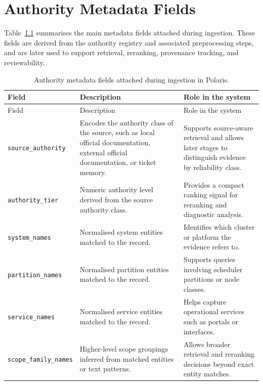 \chapter{Authority Metadata Fields}
\label{app:authority-metadata-fields}

Table~\ref{tab:authority-metadata-fields} summarises the main metadata fields attached during ingestion. These fields are derived from the authority registry and associated preprocessing steps, and are later used to support retrieval, reranking, provenance tracking, and reviewability.

\begin{longtable}{@{}p{} p{} p{}@{}}
\caption[Authority metadata fields attached during ingestion.]{Authority metadata fields attached during ingestion in Polaris.}
\label{tab:authority-metadata-fields} \\
\toprule
Field & Description & Role in the system \\
\midrule
\endfirsthead

\toprule
Field & Description & Role in the system \\
\midrule
\endhead

\bottomrule
\endfoot

\texttt{source\_authority} & Encodes the authority class of the source, such as local official documentation, external official documentation, or ticket memory. & Supports source-aware retrieval and allows later stages to distinguish evidence by reliability class. \\

\texttt{authority\_tier} & Numeric authority level derived from the source authority class. & Provides a compact ranking signal for reranking and diagnostic analysis. \\

\texttt{system\_names} & Normalised system entities matched to the record. & Identifies which cluster or platform the evidence refers to. \\

\texttt{partition\_names} & Normalised partition entities matched to the record. & Supports queries involving scheduler partitions or node classes. \\

\texttt{service\_names} & Normalised service entities matched to the record. & Helps capture operational services such as portals or interfaces. \\

\texttt{scope\_family\_names} & Higher-level scope groupings inferred from matched entities or text patterns. & Allows broader retrieval and reranking decisions beyond exact entity matches. \\


\end{longtable}
